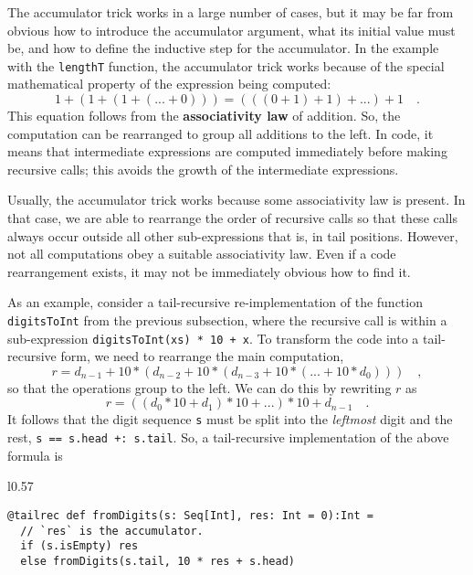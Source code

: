 The accumulator trick works in a large number of cases, but it may
be far from obvious how to introduce the accumulator argument, what
its initial value must be, and how to define the inductive step for
the accumulator. In the example with the \lstinline!lengthT! function,
the accumulator trick works because of the special mathematical property
of the expression being computed:
\[
1+\left(1+\left(1+\left(...+0\right)\right)\right)=\left(\left(\left(0+1\right)+1\right)+...\right)+1\quad.
\]
This equation follows from the \textbf{associativity
law} of addition. So, the computation can be rearranged to group all
additions to the left. In code, it means that intermediate expressions
are computed immediately before making recursive calls; this avoids
the growth of the intermediate expressions. 

Usually, the accumulator trick works because some associativity law
is present. In that case, we are able to rearrange the order of recursive
calls so that these calls always occur outside all other sub-expressions
\textemdash{} that is, in tail positions. However, not all computations
obey a suitable associativity law. Even if a code rearrangement exists,
it may not be immediately obvious how to find it.

As an example, consider a tail-recursive re-implementation of the
function \lstinline!digitsToInt! from the previous subsection, where
the recursive call is within a sub-expression \lstinline!digitsToInt(xs) * 10 + x!.
To transform the code into a tail-recursive form, we need to rearrange
the main computation,
\[
r=d_{n-1}+10*\left(d_{n-2}+10*\left(d_{n-3}+10*\left(...+10*d_{0}\right)\right)\right)\quad,
\]
so that the operations group to the left. We can do this by rewriting
$r$ as
\[
r=\left(\left(d_{0}*10+d_{1}\right)*10+...\right)*10+d_{n-1}\quad.
\]
It follows that the digit sequence \lstinline!s! must be split into
the \emph{leftmost} digit and the rest, \lstinline!s == s.head +: s.tail!.
So, a tail-recursive implementation of the above formula is

\begin{wrapfigure}{l}{0.57\columnwidth}%
\vspace{-0.95\baselineskip}
\begin{lstlisting}
@tailrec def fromDigits(s: Seq[Int], res: Int = 0):Int =
  // `res` is the accumulator.
  if (s.isEmpty) res
  else fromDigits(s.tail, 10 * res + s.head)
\end{lstlisting}

\vspace{-1.5\baselineskip}
\end{wrapfigure}%

